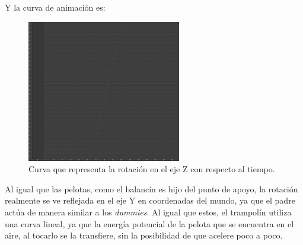 Y la curva de animación es:

\begin{figure}[H]
    \centering
    \includegraphics[width=0.6\textwidth]{imagenes/curvas/Trampolin/blue.png}
    \caption{Curva que representa la rotación en el eje Z con respecto al tiempo.}
\end{figure}

Al igual que las pelotas, como el balancín es hijo del punto de apoyo, la rotación realmente se ve reflejada en el eje Y en coordenadas del mundo, ya que el padre actúa de manera similar a los \textit{dummies}. Al igual que estos, el trampolín utiliza una curva lineal, ya que la energía potencial de la pelota que se encuentra en el aire, al tocarlo se la transfiere, sin la posibilidad de que acelere poco a poco.

\newpage